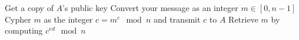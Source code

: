 \documentclass{subfiles}
\begin{document}
    \begin{procedure}
        \caption{RSA-Encode-Decode()}\label{proc:RSA-encode-decode}
        \nl Get a copy of $ A $'s public key \;\DontPrintSemicolon
        \nl Convert your message as an integer $ m \in [0, n - 1] $\DontPrintSemicolon\;
        \nl Cypher $ m $ as the integer $ c = m^{e} \mod n $ and transmit $ c $ to $ A $ \DontPrintSemicolon\;
        \nl Retrieve $ m $ by computing $ c^{ed} \mod n $
    \end{procedure}
\end{document}
